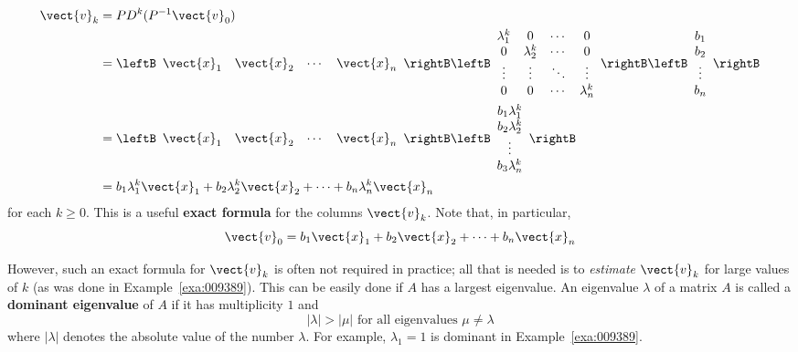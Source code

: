 \begin{align}
\vect{v}_k & = PD^k (P^{-1} \vect{v}_0) \nonumber\\
 & = \leftB \begin{array}{cccc}
\vect{x}_1 & \vect{x}_2 & \cdots & \vect{x}_n 
\end{array} \rightB  
\leftB \begin{array}{cccc}
\lambda_1^k & 0 & \cdots & 0 \\
0 & \lambda_2^k & \cdots & 0 \\
\vdots & \vdots & \ddots & \vdots \\
0 & 0 & \cdots & \lambda_n^k
\end{array}\rightB 
\leftB 
\begin{array}{c}
b_1 \\
b_2 \\
\vdots \\
b_n 
\end{array}\rightB \nonumber\\
&=  \leftB \begin{array}{cccc}
\vect{x}_1 & \vect{x}_2 & \cdots & \vect{x}_n 
\end{array} \rightB \leftB \begin{array}{c}
b_1 \lambda_1^k \\
b_2 \lambda_2^k \\
\vdots \\
b_3 \lambda_n^k 
\end{array} \rightB \nonumber\\
&= b_1 \lambda_1^k \vect{x}_1 + b_2 \lambda_2^k \vect{x}_2 + \cdots + b_n \lambda_n^k \vect{x}_n  \label{eq:vkformula}
\end{align}
for each $k \geq 0$. This is a useful \textbf{exact formula} for the columns $\vect{v}_{k}$. Note that, in particular, 
\begin{equation*}
\vect{v}_{0} = b_{1}\vect{x}_{1} + b_{2}\vect{x}_{2} + \dots  + b_{n}\vect{x}_{n}
\end{equation*}


However, such an exact formula for $\vect{v}_{k}$ is often not required in practice; all that is needed is to \textit{estimate} $\vect{v}_{k}$ for large values of $k$ (as was done in Example~\ref{exa:009389}). This can be easily done if $A$ has a largest eigenvalue. An eigenvalue $\lambda$ of a matrix $A$ is called a \textbf{dominant eigenvalue} of $A$ if it has multiplicity $1$ and
\begin{equation*}
| \lambda | > | \mu | \mbox{ for all eigenvalues } \mu \neq \lambda
\end{equation*}
where $|\lambda |$ denotes the absolute value of the number $\lambda$. For example, $\lambda_{1} = 1$ is dominant in Example~\ref{exa:009389}.


